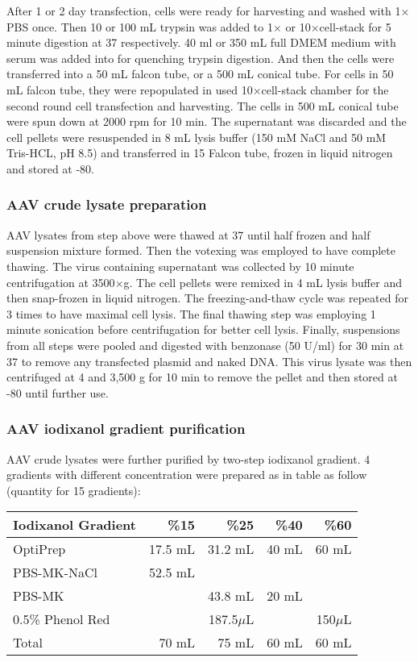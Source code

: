 After 1 or 2 day transfection, cells were ready for harvesting and washed with 1$\times$PBS once. Then 10 or 100 mL trypsin was added to 1$\times$ or 10$\times$cell-stack for 5 minute digestion at 37{\celsius} respectively. 40 ml or 350 mL full DMEM medium with serum was added into for quenching trypsin digestion. And then the cells were transferred into a 50 mL falcon tube, or a 500 mL conical tube. For cells in 50 mL falcon tube, they were repopulated in used 10$\times$cell-stack chamber for the second round cell transfection and harvesting. The cells in 500 mL conical tube were spun down at 2000 rpm for 10 min. The supernatant was discarded and the cell pellets were resuspended in 8 mL lysis buffer (150 mM NaCl and 50 mM Tris-HCL, pH 8.5) and transferred in 15 Falcon tube, frozen in liquid nitrogen and stored at -80{\celsius}.

\subsubsection{AAV crude lysate preparation}

\gls{AAV} lysates from step above were thawed at 37{\celsius} until half frozen and half suspension mixture formed. Then the votexing was employed to have complete thawing. The virus containing supernatant was collected by 10 minute centrifugation at 3500$\times$g. The cell pellets were remixed in 4 mL lysis buffer and then snap-frozen in liquid nitrogen. The freezing-and-thaw cycle was repeated for 3 times to have maximal cell lysis. The final thawing step was employing 1 minute sonication before centrifugation for better cell lysis. Finally, suspensions from all steps were pooled and digested with benzonase (50 U/ml) for 30 min at 37{\celsius} to remove any transfected plasmid and naked DNA. This virus lysate was then centrifuged at 4{\celsius} and 3,500 g for 10 min to remove the pellet and then stored at -80{\celsius} until further use.

\subsubsection{AAV iodixanol gradient purification}
\gls{AAV} crude lysates were further purified by two-step iodixanol gradient. 4 gradients with different concentration were prepared as in table as follow (quantity for 15 gradients):

\begin{center}
	\begin{tabular}{l r r r r}
	Iodixanol Gradient  & \%15 & \%25 & \%40 & \%60\\
	\hline
	OptiPrep    & 17.5 mL & 31.2 mL & 40 mL & 60 mL\\
	PBS-MK-NaCl & 52.5 mL &         &       &      \\
	PBS-MK      &         & 43.8 mL & 20 mL &      \\
	0.5\% Phenol Red &    & 187.5$\mu$L  &  & 150$\mu$L\\
	Total       & 70 mL   & 75 mL   & 60 mL & 60 mL\\
	\end{tabular}\\
\end{center}

